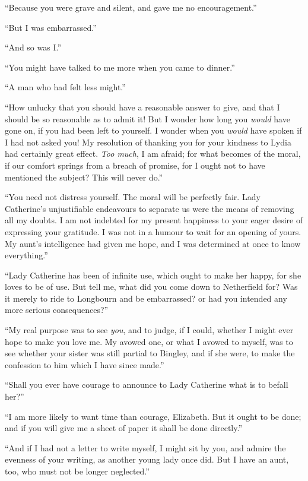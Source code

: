\documentclass[12pt]{book}
\begin{document}
``Because you were grave and silent, and gave me no encouragement.''

``But I was embarrassed.''

``And so was I.''

``You might have talked to me more when you came to dinner.''

``A man who had felt less might.''

``How unlucky that you should have a reasonable answer to give, and that I should be so reasonable as to admit it! But I wonder how long you \textit{would} have gone on, if you had been left to yourself. I wonder when you \textit{would} have spoken if I had not asked you! My resolution of thanking you for your kindness to Lydia had certainly great effect. \textit{Too much}, I am afraid; for what becomes of the moral, if our comfort springs from a breach of promise, for I ought not to have mentioned the subject? This will never do.''

``You need not distress yourself. The moral will be perfectly fair. Lady Catherine's unjustifiable endeavours to separate us were the means of removing all my doubts. I am not indebted for my present happiness to your eager desire of expressing your gratitude. I was not in a humour to wait for an opening of yours. My aunt's intelligence had given me hope, and I was determined at once to know everything.''

``Lady Catherine has been of infinite use, which ought to make her happy, for she loves to be of use. But tell me, what did you come down to Netherfield for? Was it merely to ride to Longbourn and be embarrassed? or had you intended any more serious consequences?''

``My real purpose was to see \textit{you}, and to judge, if I could, whether I might ever hope to make you love me. My avowed one, or what I avowed to myself, was to see whether your sister was still partial to Bingley, and if she were, to make the confession to him which I have since made.''

``Shall you ever have courage to announce to Lady Catherine what is to befall her?''

``I am more likely to want time than courage, Elizabeth. But it ought to be done; and if you will give me a sheet of paper it shall be done directly.''

``And if I had not a letter to write myself, I might sit by you, and admire the evenness of your writing, as another young lady once did. But I have an aunt, too, who must not be longer neglected.''
\end{document}
